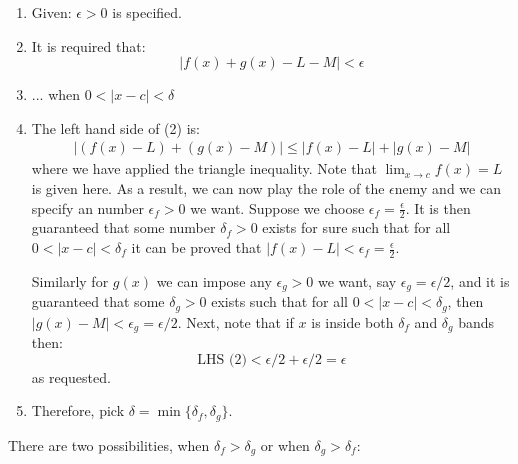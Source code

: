 \begin{itemize}
\begin{theorem}
    \end{theorem}
    \begin{prooof}
        \begin{enumerate}
            \item Given: $\epsilon>0$ is specified.
            \item It is required that:
            \begin{equation}
                |f(x)+g(x)-L-M| < \epsilon
                \label{eq:}
            \end{equation}
            \item ... when $0<|x-c|<\delta$
            \item The left hand side of (2) is:
            \begin{align}
                |(f(x)-L)+(g(x)-M)| \le |f(x)-L|+|g(x)-M|
                \label{eq:}
            \end{align}
            where we have applied the triangle inequality. Note that $\displaystyle \lim_{x\to c}f(x)=L$ is given here. As a result, we can now play the role of the $\epsilon$nemy and we can specify an number $\epsilon_f>0$ we want. Suppose we choose $\epsilon_f=\frac{\epsilon}{2}$. It is then guaranteed that some number $\delta_f>0$ exists for sure such that for all $0<|x-c|<\delta_f$ it can be proved that $|f(x)-L|<\epsilon_f=\frac{\epsilon}{2}$.
            \vspace{2mm}

            Similarly for $g(x)$ we can impose any $\epsilon_g>0$ we want, say $\epsilon_g = \epsilon/2$, and it is guaranteed that some $\delta_g>0$ exists such that for all $0<|x-c|<\delta_g$, then $|g(x)-M|<\epsilon_g=\epsilon/2$. Next, note that if $x$ is inside both $\delta_f$ and $\delta_g$ bands then:
            \begin{equation}
                \text{LHS (2)} < \epsilon/2 + \epsilon/2 = \epsilon   
                \label{eq:}
            \end{equation}
            as requested.
            \item Therefore, pick $\delta=\min\{\delta_f,\delta_g\}$.
        \end{enumerate}
        There are two possibilities, when $\delta_f>\delta_g$ or when $\delta_g>\delta_f$:
        \vspace{2mm}
        \begin{center}
\end{center}
\end{prooof}
\end{itemize}
